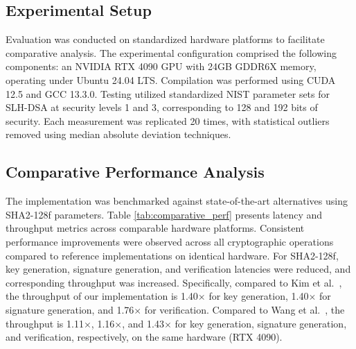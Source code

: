 \documentclass[journal]{IEEEtran}
\begin{document}
\subsection{Experimental Setup}

Evaluation was conducted on standardized hardware platforms to facilitate comparative analysis. The experimental configuration comprised the following components: an NVIDIA RTX 4090 GPU with 24GB GDDR6X memory, operating under Ubuntu 24.04 LTS. Compilation was performed using CUDA 12.5 and GCC 13.3.0.
Testing utilized standardized NIST parameter sets for SLH-DSA at security levels 1 and 3, corresponding to 128 and 192 bits of security. Each measurement was replicated 20 times, with statistical outliers removed using median absolute deviation techniques.

\subsection{Comparative Performance Analysis}

The implementation was benchmarked against state-of-the-art alternatives using SHA2-128f parameters. Table \ref{tab:comparative_perf} presents latency and throughput metrics across comparable hardware platforms.
Consistent performance improvements were observed across all cryptographic operations compared to reference implementations on identical hardware. For SHA2-128f, key generation, signature generation, and verification latencies were reduced, and corresponding throughput was increased. Specifically, compared to Kim et al.~\cite{Kim2024}, the throughput of our implementation is 1.40$\times$ for key generation, 1.40$\times$ for signature generation, and 1.76$\times$ for verification. Compared to Wang et al.~\cite{Wang2025}, the throughput is 1.11$\times$, 1.16$\times$, and 1.43$\times$ for key generation, signature generation, and verification, respectively, on the same hardware (RTX 4090).
\end{document}
